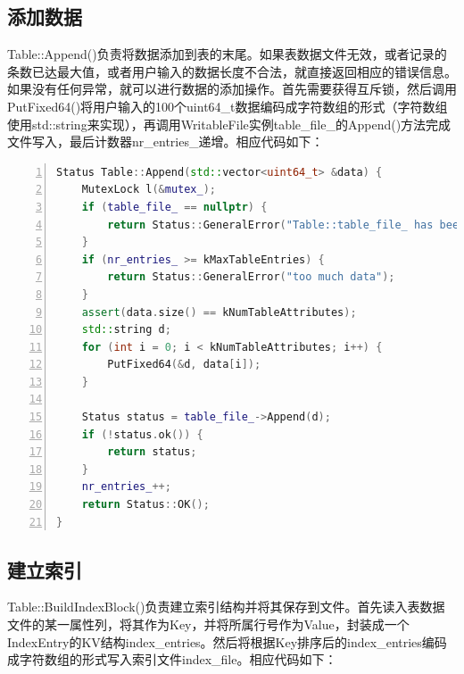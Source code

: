 \documentclass[bachelor]{thesis-uestc}
\begin{document}
\subsection{添加数据}
Table::Append()负责将数据添加到表的末尾。如果表数据文件无效，或者记录的条数已达最大值，或者用户输入的数据长度不合法，就直接返回相应的错误信息。如果没有任何异常，就可以进行数据的添加操作。首先需要获得互斥锁，然后调用PutFixed64()将用户输入的100个uint64\_t数据编码成字符数组的形式（字符数组使用std::string来实现），再调用WritableFile实例table\_file\_的Append()方法完成文件写入，最后计数器nr\_entries\_递增。相应代码如下：

\begin{lstlisting}[language=C++, basicstyle=\ttfamily\tiny, numbers=left, numberstyle=\tiny, keywordstyle=\color{blue!70}, commentstyle=\color{red!50!green!50!blue!50}, frame=shadowbox, rulesepcolor=\color{red!20!green!20!blue!20}]
Status Table::Append(std::vector<uint64_t> &data) {
	MutexLock l(&mutex_);
	if (table_file_ == nullptr) {
		return Status::GeneralError("Table::table_file_ has been closed.");
	}
	if (nr_entries_ >= kMaxTableEntries) {
		return Status::GeneralError("too much data");
	}
	assert(data.size() == kNumTableAttributes);
	std::string d;
	for (int i = 0; i < kNumTableAttributes; i++) {
		PutFixed64(&d, data[i]);
	}
	
	Status status = table_file_->Append(d);
	if (!status.ok()) {
		return status;
	}
	nr_entries_++;
	return Status::OK();
}
\end{lstlisting}

\subsection{建立索引}
Table::BuildIndexBlock()负责建立索引结构并将其保存到文件。首先读入表数据文件的某一属性列，将其作为Key，并将所属行号作为Value，封装成一个IndexEntry的KV结构index\_entries。然后将根据Key排序后的index\_entries编码成字符数组的形式写入索引文件index\_file。相应代码如下：
\end{document}
